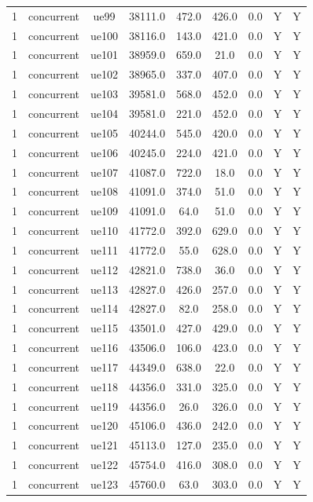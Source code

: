 \begin{table}[ht]
\begin{tabular}{|c|c|c|c|c|c|c|c|c|}
1 & concurrent & ue99 & 38111.0 & 472.0 & 426.0 & 0.0 & Y & Y \\
1 & concurrent & ue100 & 38116.0 & 143.0 & 421.0 & 0.0 & Y & Y \\
1 & concurrent & ue101 & 38959.0 & 659.0 & 21.0 & 0.0 & Y & Y \\
1 & concurrent & ue102 & 38965.0 & 337.0 & 407.0 & 0.0 & Y & Y \\
1 & concurrent & ue103 & 39581.0 & 568.0 & 452.0 & 0.0 & Y & Y \\
1 & concurrent & ue104 & 39581.0 & 221.0 & 452.0 & 0.0 & Y & Y \\
1 & concurrent & ue105 & 40244.0 & 545.0 & 420.0 & 0.0 & Y & Y \\
1 & concurrent & ue106 & 40245.0 & 224.0 & 421.0 & 0.0 & Y & Y \\
1 & concurrent & ue107 & 41087.0 & 722.0 & 18.0 & 0.0 & Y & Y \\
1 & concurrent & ue108 & 41091.0 & 374.0 & 51.0 & 0.0 & Y & Y \\
1 & concurrent & ue109 & 41091.0 & 64.0 & 51.0 & 0.0 & Y & Y \\
1 & concurrent & ue110 & 41772.0 & 392.0 & 629.0 & 0.0 & Y & Y \\
1 & concurrent & ue111 & 41772.0 & 55.0 & 628.0 & 0.0 & Y & Y \\
1 & concurrent & ue112 & 42821.0 & 738.0 & 36.0 & 0.0 & Y & Y \\
1 & concurrent & ue113 & 42827.0 & 426.0 & 257.0 & 0.0 & Y & Y \\
1 & concurrent & ue114 & 42827.0 & 82.0 & 258.0 & 0.0 & Y & Y \\
1 & concurrent & ue115 & 43501.0 & 427.0 & 429.0 & 0.0 & Y & Y \\
1 & concurrent & ue116 & 43506.0 & 106.0 & 423.0 & 0.0 & Y & Y \\
1 & concurrent & ue117 & 44349.0 & 638.0 & 22.0 & 0.0 & Y & Y \\
1 & concurrent & ue118 & 44356.0 & 331.0 & 325.0 & 0.0 & Y & Y \\
1 & concurrent & ue119 & 44356.0 & 26.0 & 326.0 & 0.0 & Y & Y \\
1 & concurrent & ue120 & 45106.0 & 436.0 & 242.0 & 0.0 & Y & Y \\
1 & concurrent & ue121 & 45113.0 & 127.0 & 235.0 & 0.0 & Y & Y \\
1 & concurrent & ue122 & 45754.0 & 416.0 & 308.0 & 0.0 & Y & Y \\
1 & concurrent & ue123 & 45760.0 & 63.0 & 303.0 & 0.0 & Y & Y \\

\end{tabular}
\end{table}
